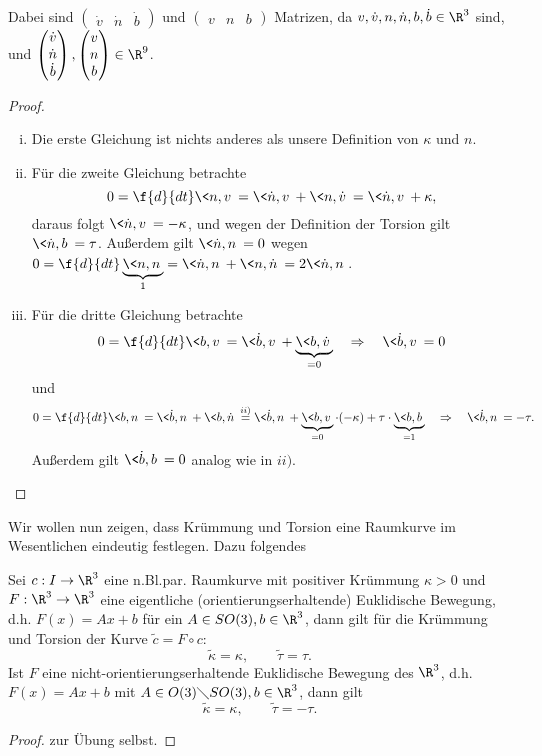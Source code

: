 \documentclass{mycourse}
\begin{document}
\begin{st}
\begin{note*}
Dabei sind $\begin{pmatrix} \dot v & \dot n & \dot b \end{pmatrix}$ und $\begin{pmatrix}  v &  n &  b \end{pmatrix}$ Matrizen, da $v, \dot v, n, \dot n, b, \dot b \in \R^3$ sind, und $\begin{pmatrix} \dot v \\ \dot n \\ \dot b \end{pmatrix}, \begin{pmatrix}  v \\  n \\  b \end{pmatrix} \in \R^9$.
\end{note*}
\begin{proof}
\begin{enumerate}[i)]
\item
	Die erste Gleichung ist nichts anderes als unsere Definition von $\kappa$ und $n$.
\item
	Für die zweite Gleichung betrachte 
\[ 0 = \f{d}{dt} \< n, v \> = \< \dot n, v \> + \< n, \dot v \> = \< \dot n, v \> + \kappa ,\]
daraus folgt $\< \dot n, v \> = - \kappa$, und wegen der Definition der Torsion gilt $\< \dot n, b \> =  \tau$. Außerdem gilt $\< \dot n, n \> = 0$ wegen $0 = \f{d}{dt} \underbrace{\< n, n \>}_{1} = \< \dot n, n \> + \< n, \dot n \> = 2 \< \dot n, n \>$.
\item
	Für die dritte Gleichung betrachte
\[ 0 = \f{d}{dt} \< b, v \> = \< \dot b, v \> + \underbrace{\< b, \dot v \>}_{=0} \quad \Rightarrow \quad \< \dot b, v \> = 0 \]
und 
\[ 0 = \f{d}{dt} \< b, n \> = \< \dot b, n \> + \< b, \dot n \> \stackrel{ii)}{=} \< \dot b, n \> + \underbrace{\< b, v \>}_{=0} \cdot (-\kappa) + \tau \cdot \underbrace{\< b, b \>}_{=1} \quad \Rightarrow \quad \< \dot b, n \> = - \tau. \]
Außerdem gilt $\< \dot b, b \> = 0$ analog wie in $ii)$.
\end{enumerate}
\end{proof}
\end{st}

Wir wollen nun zeigen, dass Krümmung und Torsion eine Raumkurve im Wesentlichen eindeutig festlegen. Dazu folgendes 
\begin{lem}
\label{7.8}
Sei $c: I \to \R^3$ eine n.Bl.par. Raumkurve mit positiver Krümmung $\kappa > 0$ und $F: \R^3 \to \R^3$ eine eigentliche (orientierungserhaltende) Euklidische Bewegung, d.h. $F(x) = Ax + b$ für ein $A \in SO(3), b \in \R^3$, dann gilt für die Krümmung und Torsion der Kurve $\tilde c = F  \circ c:$ \[ \tilde \kappa = \kappa, \qquad \tilde \tau = \tau. \]
Ist $F$ eine nicht-orientierungserhaltende Euklidische Bewegung des $\R^3$, d.h. $F(x) = Ax + b$ mit $A \in O(3) \diagdown SO(3), b \in \R^3 $, dann gilt \[ \tilde \kappa = \kappa, \qquad \tilde \tau = - \tau. \]
\begin{proof}
zur Übung selbst.
\end{proof}
\end{lem}
\end{document}
